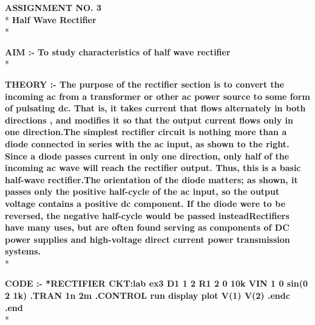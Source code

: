 \documentclass{article}
\begin{document}
\begin{center}
\Large{{\bf\textcolor{rosewood}{ASSIGNMENT NO. 3}}}\\*
\vspace{2mm}
\large{{\bf\textcolor{rosewood}{ Half Wave Rectifier}}}\\*
\vspace{5mm}
\end{center}
\begin{flushleft}
\large{{\bf\textcolor{rosewood}{AIM :-} To study characteristics of  half wave rectifier}}\vspace{5mm}\\*

\large{{\bf\textcolor{rosewood}{THEORY} :-
 The purpose of the rectifier section is to convert the incoming ac from a transformer or other ac power source to some form of pulsating dc. That is, it takes current that flows alternately in both directions , and modifies it so that the output current flows only in one direction.The simplest rectifier circuit is nothing more than a diode connected in series with the ac input, as shown to the right. Since a diode passes current in only one direction, only half of the incoming ac wave will reach the rectifier output. Thus, this is a basic half-wave rectifier.The orientation of the diode matters; as shown, it passes only the positive half-cycle of the ac input, so the output voltage contains a positive dc component. If the diode were to be reversed, the negative half-cycle would be passed insteadRectifiers have many uses, but are often found serving as components of DC power supplies and high-voltage direct current power transmission systems.}}\vspace{5mm}\\*

\large{{\bf\textcolor{rosewood}{ CODE} :-
*RECTIFIER CKT:lab ex3\newline
D1 1 2\newline 
R1 2 0 10k\newline
VIN 1 0 sin(0 2 1k)\newline
.TRAN 1n 2m\newline
.CONTROL\newline
run\newline
display\newline
plot V(1) V(2)\newline
.endc\newline
.end\newline}}\\*


\end{flushleft}
\end{document}

